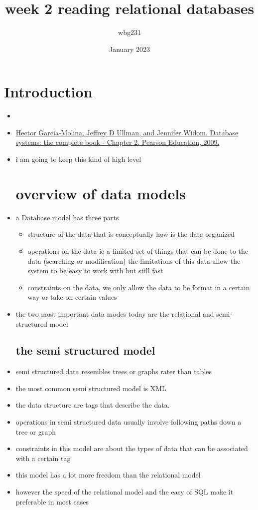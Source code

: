 \documentclass{article}
\title{week 2 reading relational databases}
\author{wbg231 }
\date{January 2023}
\begin{document}
\maketitle

\section{Introduction}
\begin{itemize}
    \item 

\item \href{https://brightspace.nyu.edu/d2l/common/dialogs/quickLink/quickLink.d2l?ou=261985&type=coursefile&fileId=ch2.pdf}{Hector Garcia-Molina, Jeffrey D Ullman, and Jennifer Widom. Database systems: the complete book - Chapter 2. Pearson Education, 2009.}
\item i am going to keep this kind of high level 
\section*{overview of data models}
\item a Database model has three parts 
\begin{itemize}
    \item structure of the data that is conceptually how is the data organized 
    \item operations on the data ie a limited set of things that can be done to the data (searching or modification) the limitations of this data allow the system to be easy to work with but still fast 
    \item constraints on the data, we only allow the data to be format in a certain way or take on certain values 
\end{itemize}
\item the two most important data modes today are the relational and semi-structured model
\subsection*{the semi structured  model}
\item semi structured data resembles trees or graphs rater than tables
\item the most common semi structured model is XML
\item the data structure are tags that describe the data. 
\item operations in semi structured data usually involve following paths down a tree or graph 
\item constraints in this model are about the types of data that can be associated with a certain tag
\item this model has a lot more freedom than the relational model 
\item however the speed of the relational model and the easy of SQL make it preferable in most cases

\end{itemize}
\end{document}

